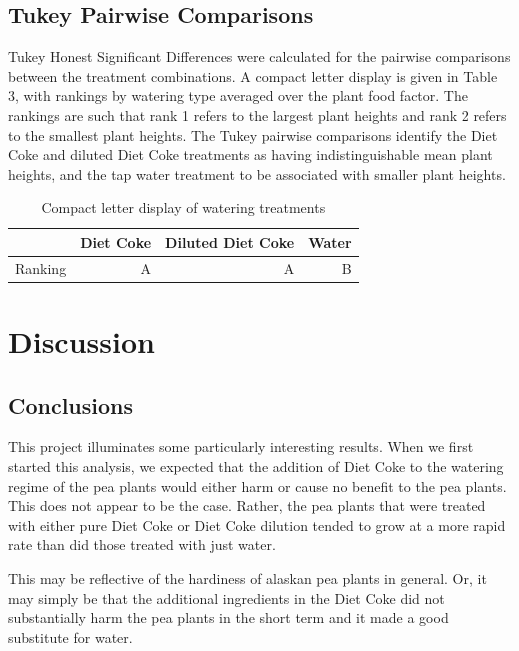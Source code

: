 \documentclass[1p,12pt]{elsarticle}\usepackage[]{graphicx}\usepackage[]{color}
\begin{document}
\subsection{Tukey Pairwise Comparisons}

Tukey Honest Significant Differences were calculated for the pairwise comparisons between the treatment combinations. A compact letter display is given in Table 3, with rankings by watering type averaged over the plant food factor. The rankings are such that rank 1 refers to the largest plant heights and rank 2 refers to the smallest plant heights.  The Tukey pairwise comparisons identify the Diet Coke and diluted Diet Coke treatments as having indistinguishable mean plant heights, and the tap water treatment to be associated with smaller plant heights. 

\begin{table}[ht]
\centering
\begin{tabular}{lrrr}
  \hline
 & Diet Coke & Diluted Diet Coke & Water \\ 
  \hline
Ranking & A & A & B \\ 
  
   \hline
\end{tabular}
\caption{Compact letter display of watering treatments}
\end{table}


\section{Discussion}

\subsection{Conclusions}
This project illuminates some particularly interesting results. When we first started this analysis, we expected that the addition of Diet Coke to the watering regime of the pea plants would either harm or cause no benefit to the pea plants. This does not appear to be the case. Rather, the pea plants that were treated with either pure Diet Coke or Diet Coke dilution tended to grow at a more rapid rate than did those treated with just water. 

This may be reflective of the hardiness of alaskan pea plants in general. Or, it may simply be that the additional ingredients in the Diet Coke did not substantially harm the pea plants in the short term and it made a good substitute for water.
\end{document}
